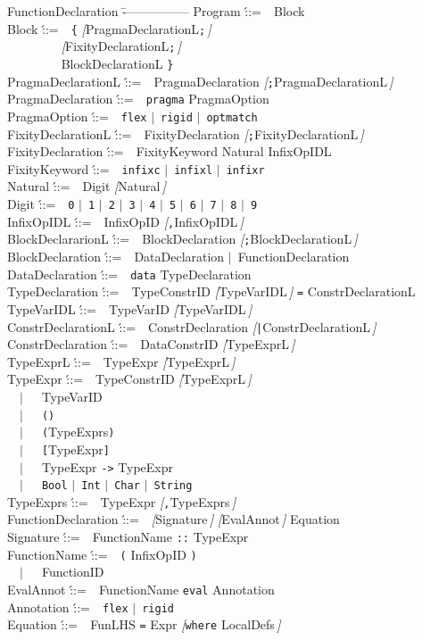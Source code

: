 \documentclass[titlepage,fleqn]{article}
\newcommand{\pr}[1]{\mbox{\tt #1}}   %
\begin{document}
\newcommand{\as}{\'::=~~}              %
\newcommand{\oR}{$\mid$~}              %
\newcommand{\Or}{\\ \>~~$\mid$~~~}     %
\newcommand{\x}[1]{\pr{#1}}            %
\newcommand{\opt}[1]{{\em [}#1$\,${\em ]}} %
\newcommand{\sig}{\\\>}                %
\newcommand{\nxt}{\\\>~~~~~~}          %

{\em
\begin{tabbing}
FunctionDeclaration \= ---------------- \kill \>
Program \as Block \sig
Block \as \x{\{} \opt{PragmaDeclarationL\x{;}$\!$}\nxt
          ~~\opt{FixityDeclarationL\x{;}$\!$}\nxt
          ~~BlockDeclarationL    \x{\}}
          \sig
PragmaDeclarationL \as PragmaDeclaration \opt{\x{;}PragmaDeclarationL} \sig
PragmaDeclaration \as \x{pragma} PragmaOption \sig
PragmaOption \as \x{flex} \oR \x{rigid} \oR \x{optmatch} \sig
FixityDeclarationL \as FixityDeclaration \opt{\x{;}FixityDeclarationL} \sig
FixityDeclaration \as FixityKeyword Natural InfixOpIDL \sig
FixityKeyword \as \x{infixc} \oR \x{infixl} \oR \x{infixr} \sig
Natural \as Digit \opt{Natural} \sig
Digit \as \x{0} \oR \x{1} \oR \x{2} \oR \x{3} \oR \x{4} \oR \x{5}
      \oR \x{6} \oR \x{7} \oR \x{8} \oR \x{9} \sig
InfixOpIDL \as InfixOpID \opt{\x{,}InfixOpIDL} \sig
BlockDeclararionL \as BlockDeclaration \opt{\x{;}BlockDeclarationL} \sig
BlockDeclaration \as DataDeclaration 
                 \oR FunctionDeclaration \sig
DataDeclaration \as \x{data} TypeDeclaration \sig
TypeDeclaration \as TypeConstrID \opt{TypeVarIDL} 
                    \x{=} ConstrDeclarationL \sig
TypeVarIDL \as TypeVarID \opt{TypeVarIDL} \sig
ConstrDeclarationL \as ConstrDeclaration
		 \opt{\x{|}ConstrDeclarationL} \sig
ConstrDeclaration \as DataConstrID \opt{TypeExprL} \sig
TypeExprL \as TypeExpr \opt{TypeExprL}  \sig
TypeExpr \as TypeConstrID \opt{TypeExprL} 
         \Or TypeVarID 
         \Or \x{()} \Or \x{(}TypeExprs\x{)} 
         \Or \x{[}TypeExpr\x{]} 
         \Or TypeExpr \x{->} TypeExpr 
         \Or \x{Bool} \oR \x{Int} 
         \oR \x{Char} \oR \x{String} \sig
TypeExprs \as TypeExpr \opt{\x{,}TypeExprs}  \sig
FunctionDeclaration \as \opt{Signature} \opt{EvalAnnot} Equation \sig
Signature \as FunctionName \x{::} TypeExpr \sig
FunctionName \as \x{(} InfixOpID \x{)} \Or FunctionID \sig
EvalAnnot \as FunctionName \x{eval} Annotation \sig
Annotation \as \x{flex} \oR \x{rigid} \sig
Equation \as FunLHS \x{=} Expr \opt{\x{where} LocalDefs}

\end{tabbing}}
\end{document}
